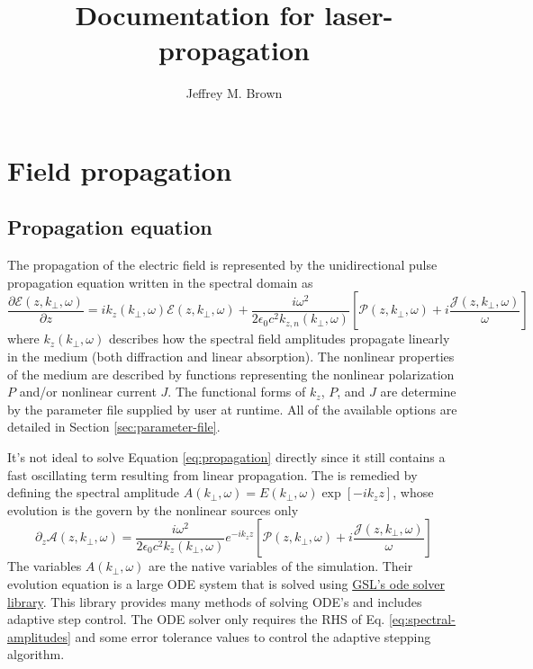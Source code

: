 \documentclass{article}
\title{Documentation for laser-propagation}
\author{Jeffrey M. Brown}
\begin{document}
\maketitle
\tableofcontents

\section{Field propagation}
\subsection{Propagation equation}
The propagation of the electric field is represented by the
unidirectional pulse propagation equation written in the spectral
domain as
\begin{equation}
  \label{eq:propagation}
  \frac{\partial \mathcal{E}(z, k_\perp,\omega)}{\partial z} = ik_z(k_\perp,\omega) \mathcal{E}(z, k_\perp,\omega) + \frac{i\omega^2}{2\epsilon_0 c^2 k_{z,n}(k_\perp,\omega)}\left[\mathcal{P}(z, k_\perp,\omega) + i \frac{\mathcal{J}(z, k_\perp,\omega)}{\omega}\right]
\end{equation}
where $k_z(k_\perp,\omega)$ describes how the spectral field
amplitudes propagate linearly in the medium (both diffraction and
linear absorption). The nonlinear properties of the medium are
described by functions representing the nonlinear polarization $P$
and/or nonlinear current $J$. The functional forms of $k_z$, $P$, and
$J$ are determine by the parameter file supplied by user at
runtime. All of the available options are detailed in Section
\ref{sec:parameter-file}.


It's not ideal to solve Equation \eqref{eq:propagation} directly since
it still contains a fast oscillating term resulting from linear
propagation. The is remedied by defining the spectral amplitude
$A(k_\perp,\omega) = E(k_\perp,\omega)\exp[-ik_z z]$, whose evolution is the
govern by the nonlinear sources only
\begin{equation}
  \label{eq:spectral-amplitudes}
  \partial_z \mathcal{A}(z,k_\perp,\omega) = \frac{i\omega^2}{2\epsilon_0 c^2 k_z(k_\perp,\omega)} e^{-ik_z z} \left[\mathcal{P}(z,k_\perp,\omega)  + i \frac{\mathcal{J}(z, k_\perp,\omega)}{\omega}\right]
\end{equation}
The variables $A(k_\perp,\omega)$ are the native variables of the
simulation. Their evolution equation is a large ODE system that is
solved using
\href{https://www.gnu.org/software/gsl/doc/html/ode-initval.html}{GSL's
  ode solver library}. This library provides many methods of solving
ODE's and includes adaptive step control. The ODE solver only requires
the RHS of Eq. \ref{eq:spectral-amplitudes} and some error tolerance
values to control the adaptive stepping algorithm.
\end{document}
